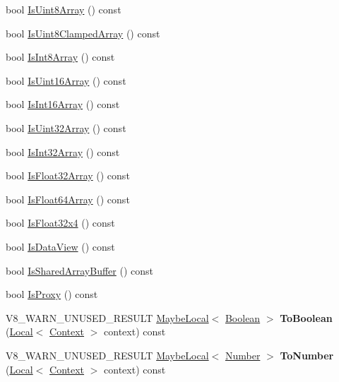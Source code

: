 \begin{DoxyCompactItemize}
bool \hyperlink{classv8_1_1_value_acbe2cd9c9cce96ee498677ba37c8466d}{Is\+Uint8\+Array} () const 
\item 
bool \hyperlink{classv8_1_1_value_ad3cb464ab5ef0215bd2cbdd4eb2b7e3d}{Is\+Uint8\+Clamped\+Array} () const 
\item 
bool \hyperlink{classv8_1_1_value_a10a88a2794271dfcd9c3abd565e8f28a}{Is\+Int8\+Array} () const 
\item 
bool \hyperlink{classv8_1_1_value_a4a45fabf58b241f5de3086a3dd0a09ae}{Is\+Uint16\+Array} () const 
\item 
bool \hyperlink{classv8_1_1_value_a928c586639dd75ae4efdaa66b1fc4d50}{Is\+Int16\+Array} () const 
\item 
bool \hyperlink{classv8_1_1_value_a5e39229dc74d534835cf4ceba10676f4}{Is\+Uint32\+Array} () const 
\item 
bool \hyperlink{classv8_1_1_value_a48eac78a49c8b42d9f8cf05c514b3750}{Is\+Int32\+Array} () const 
\item 
bool \hyperlink{classv8_1_1_value_a4effc7ca1a221dd8c1e23c0f28145ef0}{Is\+Float32\+Array} () const 
\item 
bool \hyperlink{classv8_1_1_value_a293f140b81b0219d1497e937ed948b1e}{Is\+Float64\+Array} () const 
\item 
bool \hyperlink{classv8_1_1_value_ab071bf567d89c8ce1489b1b7d93abc36}{Is\+Float32x4} () const 
\item 
bool \hyperlink{classv8_1_1_value_afd20ab51e79658acc405c12dad2260ab}{Is\+Data\+View} () const 
\item 
bool \hyperlink{classv8_1_1_value_aa4ce26f174a4c1823dec56eb946d3134}{Is\+Shared\+Array\+Buffer} () const 
\item 
bool \hyperlink{classv8_1_1_value_a8a056f765e6e07a1d957fdc1be9b00d5}{Is\+Proxy} () const 
\item 
V8\+\_\+\+W\+A\+R\+N\+\_\+\+U\+N\+U\+S\+E\+D\+\_\+\+R\+E\+S\+U\+LT \hyperlink{classv8_1_1_maybe_local}{Maybe\+Local}$<$ \hyperlink{classv8_1_1_boolean}{Boolean} $>$ {\bfseries To\+Boolean} (\hyperlink{classv8_1_1_local}{Local}$<$ \hyperlink{classv8_1_1_context}{Context} $>$ context) const \hypertarget{classv8_1_1_value_a40a62da1dd52184cc4c1fd735c538f8b}{}\label{classv8_1_1_value_a40a62da1dd52184cc4c1fd735c538f8b}

\item 
V8\+\_\+\+W\+A\+R\+N\+\_\+\+U\+N\+U\+S\+E\+D\+\_\+\+R\+E\+S\+U\+LT \hyperlink{classv8_1_1_maybe_local}{Maybe\+Local}$<$ \hyperlink{classv8_1_1_number}{Number} $>$ {\bfseries To\+Number} (\hyperlink{classv8_1_1_local}{Local}$<$ \hyperlink{classv8_1_1_context}{Context} $>$ context) const \hypertarget{classv8_1_1_value_a9fa8386aa436c2b83c9af6a65b8a2cad}{}\label{classv8_1_1_value_a9fa8386aa436c2b83c9af6a65b8a2cad}


\end{DoxyCompactItemize}
